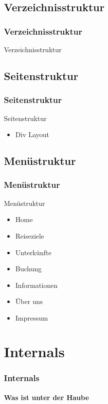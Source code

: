 \documentclass[xcolor=dvipsnames]{beamer}
\begin{document}
\subsection{Verzeichnisstruktur}
\begin{frame} %
  \frametitle{Verzeichnisstruktur} %
  \begin{block}{Verzeichnisstruktur}
  \end{block}
\end{frame}

\subsection{Seitenstruktur}
\begin{frame} %
  \frametitle{Seitenstruktur} %
  \begin{block}{Seitenstruktur}
	\begin{itemize}
		\item Div Layout
	\end{itemize}
  \end{block}
\end{frame}

\subsection{Menüstruktur}
\begin{frame} %
  \frametitle{Menüstruktur} %
  \begin{block}{Menüstruktur}
	\begin{itemize}
		\item Home
		\item Reiseziele
		\item Unterkünfte
		\item Buchung
		\item Informationen
		\item Über uns
		\item Impressum
	\end{itemize}
  \end{block}
\end{frame}


\section{Internals}
\begin{frame} %
  \frametitle{Internals} %
  \framesubtitle{Was ist unter der Haube} %
\end{frame}
\end{document}
